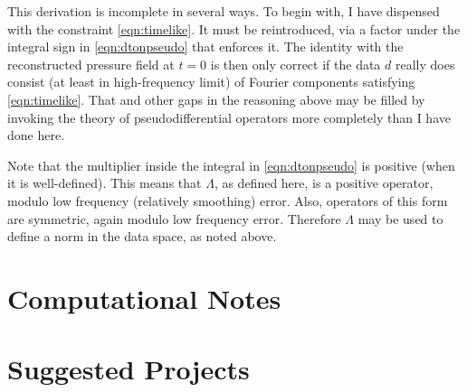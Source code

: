 This derivation is incomplete in several ways. To begin with, I have dispensed with the constraint \ref{eqn:timelike}. It must be reintroduced, via a factor under the integral sign in \ref{eqn:dtonpseudo} that enforces it. The identity with the reconstructed pressure field at $t=0$ is then only correct if the data $d$ really does consist (at least in high-frequency limit) of Fourier components satisfying \ref{eqn:timelike}. That and other gaps in the reasoning above may be filled by invoking the theory of pseudodifferential operators more completely than I have done here.

Note that the multiplier inside the integral in \ref{eqn:dtonpseudo} is positive (when it is well-defined). This means that $\Lambda$, as defined here, is a positive operator, modulo low frequency (relatively smoothing) error. Also, operators of this form are symmetric, again modulo low frequency error. Therefore $\Lambda$ may be used to define a norm in the data space, as noted above.





\section{Computational Notes}

\section{Suggested Projects}


